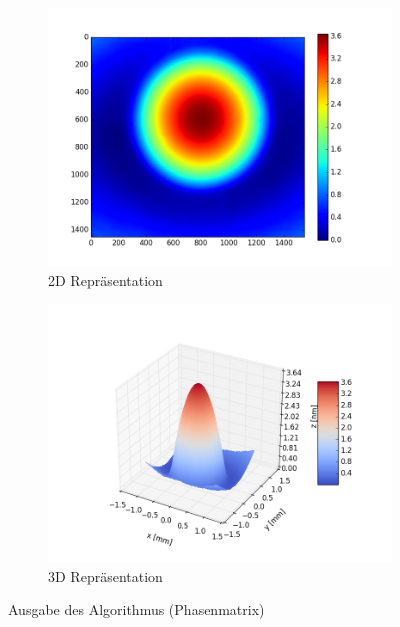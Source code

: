 \begin{figure}[htbp]
	\centering
	\begin{subfigure}[b]{0.35\textwidth}
		\centering
		\includegraphics[width=\textwidth]{img/2D_E10001_edf_ref_start0001_1-10_edf}
		\caption[2D Ausgabe]{2D Repräsentation}
		\label{fig:ausgabe_2d}
	\end{subfigure}
	\begin{subfigure}[b]{0.35\textwidth}
		\centering
		\includegraphics[width=\textwidth]{img/3D_E10001_edf_ref_start0001_1-10_edf}
		\caption[3D Ausgabe]{3D Repräsentation}
		\label{fig:ausgabe_3d}
	\end{subfigure}
	\caption[Ausgabe]{Ausgabe des Algorithmus (Phasenmatrix)}
	\label{fig:ausgabebild}
\end{figure}

